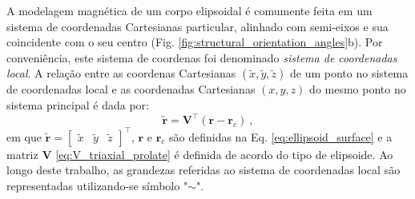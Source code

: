 A modelagem magnética de um corpo elipsoidal é comumente feita em um sistema de coordenadas Cartesianas particular, alinhado com semi-eixos e sua coincidente com o seu centro (Fig. \ref{fig:structural_orientation_angles}b). Por conveniência, este sistema de coordenas foi denominado \textit{sistema de coordenadas local}.
A relação entre as coordenas Cartesianas $(\tilde{x}, \tilde{y}, \tilde{z})$
de um ponto no sistema de coordenadas local e as coordenadas Cartesianas $(x, y, z)$ do mesmo ponto no sistema principal é dada por:
\begin{equation}
\tilde{\mathbf{r}} = \mathbf{V}^{\top} \left( \mathbf{r} - \mathbf{r}_{c} \right) \: ,
\label{eq:coord_transformation}
\end{equation}
em que 
$\tilde{\mathbf{r}} = [\begin{array}{ccc} \tilde{x} & 
\tilde{y} & 
\tilde{z} \end{array} ]^{\top}$,
$\mathbf{r}$ e $\mathbf{r}_{c}$
são definidas na Eq. \ref{eq:ellipsoid_surface} e a matriz $\mathbf{V}$ \ref{eq:V_triaxial_prolate}
é definida de acordo do tipo de elipsoide. Ao longo deste trabalho, as grandezas referidas ao sistema de coordenadas local são representadas utilizando-se símbolo "$\sim$".

